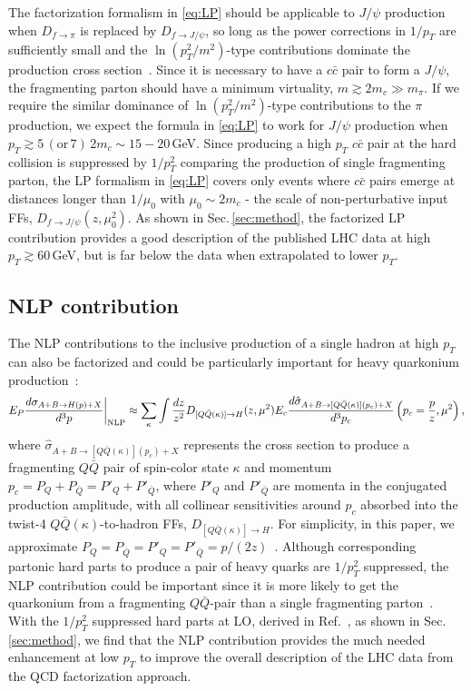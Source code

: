 \documentclass[Physsubmission, Phys]{SciPost}
\begin{document}
The factorization formalism in \eqref{eq:LP} 
should be applicable to $J/\psi$ production when $D_{f\to \pi}$ is replaced by $D_{f\to J/\psi}$, so long as the power corrections in $1/p_T$ are sufficiently small and the $\ln(p_T^2/m^2)$-type contributions dominate the production cross section~\cite{Nayak:2005rt}. Since it is necessary to have a $c\bar{c}$ pair to form a $J/\psi$, the fragmenting parton should have a minimum virtuality, $m\gtrsim 2m_c \gg m_\pi$. If we require the similar dominance of $\ln(p_T^2/m^2)$-type contributions to the $\pi$ production, we expect the formula in \eqref{eq:LP} to work for $J/\psi$ production when $p_T \gtrsim 5\, (\text{or}\, 7)\, 2m_c \sim 15-20$\,GeV. Since producing a high $p_T$ $c\bar{c}$ pair at the hard collision is suppressed by $1/p_T^2$ comparing the production of single fragmenting parton, the LP formalism in \eqref{eq:LP} covers only events where $c\bar{c}$ pairs emerge at distances longer than  $1/\mu_0$ with $\mu_0 \sim 2m_c$ - the scale of non-perturbative input FFs, $D_{f\to J/\psi}(z,\mu_0^2)$. As shown in Sec.\,\ref{sec:method}, the factorized LP contribution provides a good description of the published LHC data at high $p_T\gtrsim 60$\,GeV, but is far below the data when extrapolated to lower $p_T$.


\subsection{NLP contribution}
\label{subsec:NLP}

The NLP contributions to the inclusive production of a single hadron at high $p_T$ can also be factorized and could be particularly important for heavy quarkonium production~\cite{Kang:2014tta}: 
\begin{align}
E_P\frac{d\sigma_{A+B\to H(p)+X}}{d^3p}\bigg|_{\rm NLP}\approx 
\sum_{\kappa}\int \frac{dz}{z^2} D_{[Q\bar{Q}(\kappa)]\to H}(z,\mu^2)
E_c\frac{d\hat{\sigma}_{A+B\to [Q\bar{Q}(\kappa)](p_c)+X}}{d^3p_c}\left(p_c=\frac{p}{z},\mu^2\right),
\label{eq:NLP}
\end{align}
where $\hat{\sigma}_{A+B\to [Q\bar{Q}(\kappa)](p_c)+X}$ represents the cross section to produce a fragmenting $Q\bar{Q}$ pair of spin-color state $\kappa$ and momentum $p_c = P_Q+P_{\bar{Q}} = P'_Q+P'_{\bar{Q}}$, where $P'_Q$ and $P'_{\bar{Q}}$ are momenta in the conjugated production amplitude, with all collinear sensitivities around $p_c$ absorbed into the twist-4 $Q\bar{Q}(\kappa)$-to-hadron FFs, $D_{[Q\bar{Q}(\kappa)]\to H}$.  For simplicity, in this paper, we approximate $P_Q=P_{\bar{Q}}=P'_Q=P'_{\bar{Q}}=p/(2z)$~\cite{Kang:2014tta}. Although corresponding partonic hard parts to produce a pair of heavy quarks are $1/p_T^2$ suppressed, the NLP contribution could be important since it is more likely to get the quarkonium from a fragmenting $Q\bar{Q}$-pair than a single fragmenting parton~\cite{Kang:2014tta}.  With the $1/p_T^2$ suppressed hard parts at LO, derived in Ref.~\cite{Kang:2014pya}, as shown in Sec.\,\ref{sec:method}, we find that the NLP contribution provides the much needed enhancement at low $p_T$ to improve the overall description of the LHC data from the QCD factorization approach.
\end{document}
